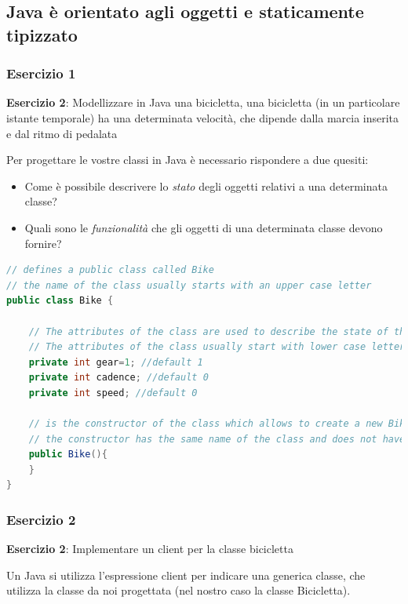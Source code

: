 \documentclass{article}
\theoremstyle{definition}
\begin{document}
\subsection{Java \`e orientato agli oggetti e staticamente tipizzato}


\subsubsection{Esercizio 1}
\begin{framed}
\textbf{Esercizio 2}: Modellizzare in Java una bicicletta, una bicicletta (in un particolare istante temporale) ha una determinata velocit\`a, che dipende dalla marcia inserita e dal ritmo di pedalata
\end{framed}

Per progettare le vostre classi in Java \`e necessario rispondere a due quesiti:
\begin{itemize}
\item Come \`e possibile descrivere lo \emph{stato} degli oggetti relativi a una determinata classe?
\item Quali sono le \emph{funzionalit\`a} che gli oggetti di una determinata classe devono fornire?
\end{itemize}


\begin{lstlisting}[language=Java,escapechar=|]
// defines a public class called Bike 
// the name of the class usually starts with an upper case letter
public class Bike {
	
	// The attributes of the class are used to describe the state of the class and are usually private or protected 
	// The attributes of the class usually start with lower case letters
	private int gear=1; //default 1
	private int cadence; //default 0
	private int speed; //default 0
	
	// is the constructor of the class which allows to create a new Bike
	// the constructor has the same name of the class and does not have a return type
	public Bike(){
	}
}
\end{lstlisting}


\subsubsection{Esercizio 2}
\begin{framed}
\textbf{Esercizio 2}: Implementare un client per la classe bicicletta
\end{framed}
Un Java si utilizza l'espressione client per indicare una generica classe, che utilizza la classe da noi progettata (nel nostro caso la classe Bicicletta). 
\end{document}
